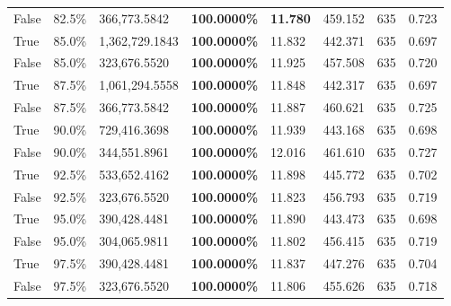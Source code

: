 \begin{table}[H]
\begin{tabular}{lllrllll}
\cline{1-8}
False & 82.5\% & 366,773.5842 & \bfseries \color{red} 100.0000\% & \bfseries \color{red} 11.780 & 459.152 & 635 & 0.723 \\
\cline{1-8}
True & 85.0\% & 1,362,729.1843 & \bfseries \color{red} 100.0000\% & 11.832 & 442.371 & 635 & 0.697 \\
\cline{1-8}
False & 85.0\% & 323,676.5520 & \bfseries \color{red} 100.0000\% & 11.925 & 457.508 & 635 & 0.720 \\
\cline{1-8}
True & 87.5\% & 1,061,294.5558 & \bfseries \color{red} 100.0000\% & 11.848 & 442.317 & 635 & 0.697 \\
\cline{1-8}
False & 87.5\% & 366,773.5842 & \bfseries \color{red} 100.0000\% & 11.887 & 460.621 & 635 & 0.725 \\
\cline{1-8}
True & 90.0\% & 729,416.3698 & \bfseries \color{red} 100.0000\% & 11.939 & 443.168 & 635 & 0.698 \\
\cline{1-8}
False & 90.0\% & 344,551.8961 & \bfseries \color{red} 100.0000\% & 12.016 & 461.610 & 635 & 0.727 \\
\cline{1-8}
True & 92.5\% & 533,652.4162 & \bfseries \color{red} 100.0000\% & 11.898 & 445.772 & 635 & 0.702 \\
\cline{1-8}
False & 92.5\% & 323,676.5520 & \bfseries \color{red} 100.0000\% & 11.823 & 456.793 & 635 & 0.719 \\
\cline{1-8}
True & 95.0\% & 390,428.4481 & \bfseries \color{red} 100.0000\% & 11.890 & 443.473 & 635 & 0.698 \\
\cline{1-8}
False & 95.0\% & 304,065.9811 & \bfseries \color{red} 100.0000\% & 11.802 & 456.415 & 635 & 0.719 \\
\cline{1-8}
True & 97.5\% & 390,428.4481 & \bfseries \color{red} 100.0000\% & 11.837 & 447.276 & 635 & 0.704 \\
\cline{1-8}
False & 97.5\% & 323,676.5520 & \bfseries \color{red} 100.0000\% & 11.806 & 455.626 & 635 & 0.718 \\
\cline{1-8}
\bottomrule
\end{tabular}
\end{table}
